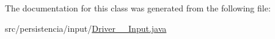 The documentation for this class was generated from the following file\+:\begin{DoxyCompactItemize}
\item 
src/persistencia/input/\hyperlink{Driver____Input_8java}{Driver\+\_\+\+\_\+\+Input.\+java}\end{DoxyCompactItemize}
